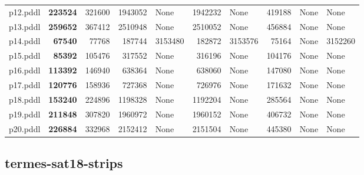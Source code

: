 \documentclass{article}
\begin{document}
\begin{tabular}{@{}lrrrrrrrrr@{}}
p12.pddl & \textbf{223524} & 321600 & 1943052 & \multicolumn{1}{|l|}{None} & 1942232 & \multicolumn{1}{|l|}{None} & 419188 & \multicolumn{1}{|l|}{None} & \multicolumn{1}{|l|}{None} \\
p13.pddl & \textbf{259652} & 367412 & 2510948 & \multicolumn{1}{|l|}{None} & 2510052 & \multicolumn{1}{|l|}{None} & 456884 & \multicolumn{1}{|l|}{None} & \multicolumn{1}{|l|}{None} \\
p14.pddl & \textbf{67540} & 77768 & 187744 & 3153480 & 182872 & 3153576 & 75164 & \multicolumn{1}{|l|}{None} & 3152260 \\
p15.pddl & \textbf{85392} & 105476 & 317552 & \multicolumn{1}{|l|}{None} & 316196 & \multicolumn{1}{|l|}{None} & 104176 & \multicolumn{1}{|l|}{None} & \multicolumn{1}{|l|}{None} \\
p16.pddl & \textbf{113392} & 146940 & 638364 & \multicolumn{1}{|l|}{None} & 638060 & \multicolumn{1}{|l|}{None} & 147080 & \multicolumn{1}{|l|}{None} & \multicolumn{1}{|l|}{None} \\
p17.pddl & \textbf{120776} & 158936 & 727368 & \multicolumn{1}{|l|}{None} & 726976 & \multicolumn{1}{|l|}{None} & 171632 & \multicolumn{1}{|l|}{None} & \multicolumn{1}{|l|}{None} \\
p18.pddl & \textbf{153240} & 224896 & 1198328 & \multicolumn{1}{|l|}{None} & 1192204 & \multicolumn{1}{|l|}{None} & 285564 & \multicolumn{1}{|l|}{None} & \multicolumn{1}{|l|}{None} \\
p19.pddl & \textbf{211848} & 307820 & 1960972 & \multicolumn{1}{|l|}{None} & 1960152 & \multicolumn{1}{|l|}{None} & 406732 & \multicolumn{1}{|l|}{None} & \multicolumn{1}{|l|}{None} \\
p20.pddl & \textbf{226884} & 332968 & 2152412 & \multicolumn{1}{|l|}{None} & 2151504 & \multicolumn{1}{|l|}{None} & 445380 & \multicolumn{1}{|l|}{None} & \multicolumn{1}{|l|}{None} \\
\end{tabular}

\hypertarget{search_start_memory-termes-sat18-strips}{}
\subsection*{termes-sat18-strips}
\end{document}
